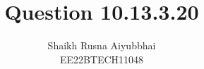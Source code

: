 \documentclass[]{article}
\title{Question 10.13.3.20}
\author{Shaikh Rusna Aiyubbhai \\ EE22BTECH11048}
\date{}
\begin{document}
\maketitle
\providecommand{\pr}[1]{\ensuremath{\Pr\left(#1\right)}}
\providecommand{\prt}[2]{\ensuremath{p_{#1}^{\left(#2\right)} }}        %
\providecommand{\qfunc}[1]{\ensuremath{Q\left(#1\right)}}
\providecommand{\sbrak}[1]{\ensuremath{{}\left[#1\right]}}
\providecommand{\lsbrak}[1]{\ensuremath{{}\left[#1\right.}}
\providecommand{\rsbrak}[1]{\ensuremath{{}\left.#1\right]}}
\providecommand{\brak}[1]{\ensuremath{\left(#1\right)}}
\providecommand{\lbrak}[1]{\ensuremath{\left(#1\right.}}
\providecommand{\rbrak}[1]{\ensuremath{\left.#1\right)}}
\providecommand{\cbrak}[1]{\ensuremath{\left\{#1\right\}}}
\providecommand{\lcbrak}[1]{\ensuremath{\left\{#1\right.}}
\providecommand{\rcbrak}[1]{\ensuremath{\left.#1\right\}}}
\newcommand{\sgn}{\mathop{\mathrm{sgn}}}
\providecommand{\abs}[1]{\left\vert#1\right\vert}
\providecommand{\res}[1]{\Res\displaylimits_{#1}} 
\providecommand{\norm}[1]{\left\lVert#1\right\rVert}
\providecommand{\mtx}[1]{\mathbf{#1}}
\providecommand{\mean}[1]{E\left[ #1 \right]}
\providecommand{\cond}[2]{#1\middle|#2}
\providecommand{\fourier}{\overset{\mathcal{F}}{ \rightleftharpoons}}
\newenvironment{amatrix}[1]{%
  \left(\begin{array}{@{}*{#1}{c}|c@{}}
}{%
  \end{array}\right)
}
\newcommand{\solution}{\noindent \textbf{Solution: }}
\newcommand{\cosec}{\,\text{cosec}\,}
\providecommand{\dec}[2]{\ensuremath{\overset{#1}{\underset{#2}{\gtrless}}}}
\newcommand{\myvec}[1]{\ensuremath{\begin{pmatrix}#1\end{pmatrix}}}
\newcommand{\mydet}[1]{\ensuremath{\begin{vmatrix}#1\end{vmatrix}}}
\newcommand{\myaugvec}[2]{\ensuremath{\begin{amatrix}{#1}#2\end{amatrix}}}
\providecommand{\rank}{\text{rank}}
\providecommand{\pr}[1]{\ensuremath{\Pr\left(#1\right)}}
\providecommand{\qfunc}[1]{\ensuremath{Q\left(#1\right)}}
	\newcommand*{\permcomb}[4][0mu]{{{}^{#3}\mkern#1#2_{#4}}}
\newcommand*{\perm}[1][-3mu]{\permcomb[#1]{P}}
\newcommand*{\comb}[1][-1mu]{\permcomb[#1]{C}}
\end{document}
